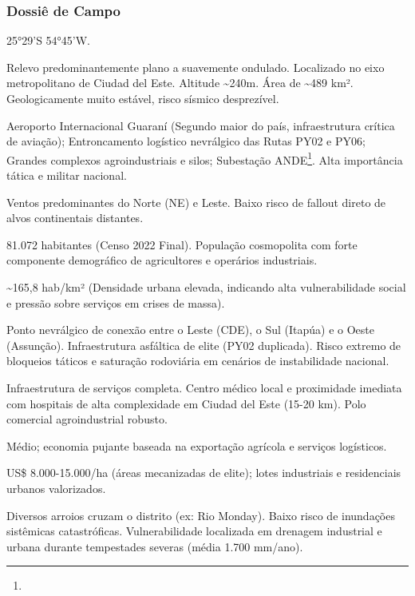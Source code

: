 \subsubsection{Dossiê de Campo}
\begin{description}[style=nextline,leftmargin=0.5cm,font=\bfseries]
\item[Coordenadas]  25°29'S 54°45'W.
\item[Topografia]  Relevo predominantemente plano a suavemente ondulado. Localizado no eixo metropolitano de Ciudad del Este. Altitude \textasciitilde 240m. Área de \textasciitilde 489 km². Geologicamente muito estável, risco sísmico desprezível.
\item[Alvos Estratégicos]  Aeroporto Internacional Guaraní (Segundo maior do país, infraestrutura crítica de aviação); Entroncamento logístico nevrálgico das Rutas PY02 e PY06; Grandes complexos agroindustriais e silos; Subestação ANDE\footnote{\fineANDE}. Alta importância tática e militar nacional.
\item[Fallout]  Ventos predominantes do Norte (NE) e Leste. Baixo risco de fallout direto de alvos continentais distantes.
\item[População]  81.072 habitantes (Censo 2022 Final). População cosmopolita com forte componente demográfico de agricultores e operários industriais.
\item[Densidade]  \textasciitilde 165,8 hab/\allowbreak km² (Densidade urbana elevada, indicando alta vulnerabilidade social e pressão sobre serviços em crises de massa).
\item[Vias de Acesso]  Ponto nevrálgico de conexão entre o Leste (CDE), o Sul (Itapúa) e o Oeste (Assunção). Infraestrutura asfáltica de elite (PY02 duplicada). Risco extremo de bloqueios táticos e saturação rodoviária em cenários de instabilidade nacional.
\item[Serviços]  Infraestrutura de serviços completa. Centro médico local e proximidade imediata com hospitais de alta complexidade em Ciudad del Este (15-20 km). Polo comercial agroindustrial robusto.
\item[Custo de Vida]  Médio; economia pujante baseada na exportação agrícola e serviços logísticos.
\item[Preço da Terra]  US\$ 8.000-15.000/\allowbreak ha (áreas mecanizadas de elite); lotes industriais e residenciais urbanos valorizados.
\item[Hidrologia]  Diversos arroios cruzam o distrito (ex: Rio Monday). Baixo risco de inundações sistêmicas catastróficas. Vulnerabilidade localizada em drenagem industrial e urbana durante tempestades severas (média 1.700 mm/\allowbreak ano).

\end{description}
